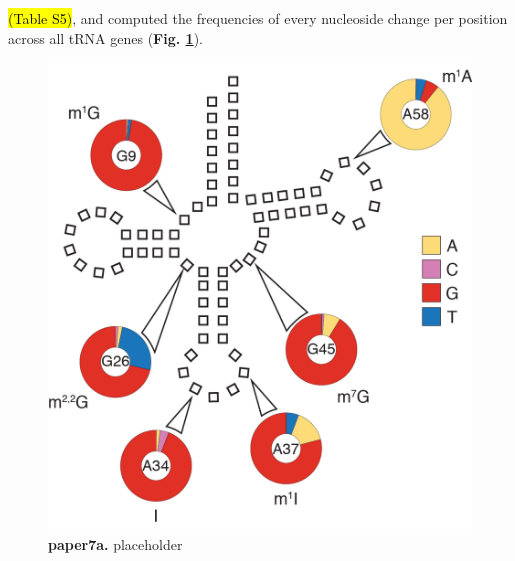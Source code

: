 \documentclass[12pt]{rockefeller}
\begin{document}









\hl{(Table S5)}, and computed the frequencies of every nucleoside change per position across all tRNA genes (\textbf{Fig. \ref{paper7a}}). 

\begin{figure}[!ht]%
\centering
\includegraphics[scale=1]{paper7a.png}%
\caption[paper7a]
{\textbf{paper7a.}
placeholder}
\centering
\label{paper7a}%
\end{figure}
\end{document}
